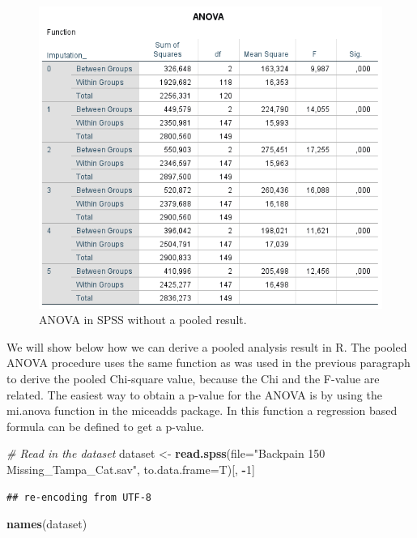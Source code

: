 \documentclass[]{book}
\newenvironment{Shaded}{\begin{snugshade}}{\end{snugshade}}
\newcommand{\KeywordTok}[1]{\textcolor[rgb]{0.13,0.29,0.53}{\textbf{#1}}}
\newcommand{\DataTypeTok}[1]{\textcolor[rgb]{0.13,0.29,0.53}{#1}}
\newcommand{\DecValTok}[1]{\textcolor[rgb]{0.00,0.00,0.81}{#1}}
\newcommand{\StringTok}[1]{\textcolor[rgb]{0.31,0.60,0.02}{#1}}
\newcommand{\CommentTok}[1]{\textcolor[rgb]{0.56,0.35,0.01}{\textit{#1}}}
\newcommand{\OperatorTok}[1]{\textcolor[rgb]{0.81,0.36,0.00}{\textbf{#1}}}
\newcommand{\NormalTok}[1]{#1}
\theoremstyle{definition}
\theoremstyle{definition}
\theoremstyle{definition}
\theoremstyle{remark}
\begin{document}
\begin{figure}

{\centering \includegraphics[width=0.9\linewidth]{images/table5.7} 

}

\caption{ANOVA in SPSS without a pooled result.}\label{fig:tab5-7}
\end{figure}

We will show below how we can derive a pooled analysis result in R. The
pooled ANOVA procedure uses the same function as was used in the
previous paragraph to derive the pooled Chi-square value, because the
Chi and the F-value are related. The easiest way to obtain a p-value for
the ANOVA is by using the mi.anova function in the miceadds package. In
this function a regression based formula can be defined to get a
p-value.

\begin{Shaded}
\begin{Highlighting}[]
\CommentTok{# Read in the dataset}
\NormalTok{dataset <-}\StringTok{ }\KeywordTok{read.spss}\NormalTok{(}\DataTypeTok{file=}\StringTok{"Backpain 150 Missing_Tampa_Cat.sav"}\NormalTok{, }\DataTypeTok{to.data.frame=}\NormalTok{T)[, }\OperatorTok{-}\DecValTok{1}\NormalTok{]}
\end{Highlighting}
\end{Shaded}

\begin{verbatim}
## re-encoding from UTF-8
\end{verbatim}

\begin{Shaded}
\begin{Highlighting}[]
\KeywordTok{names}\NormalTok{(dataset)}
\end{Highlighting}
\end{Shaded}
\end{document}
